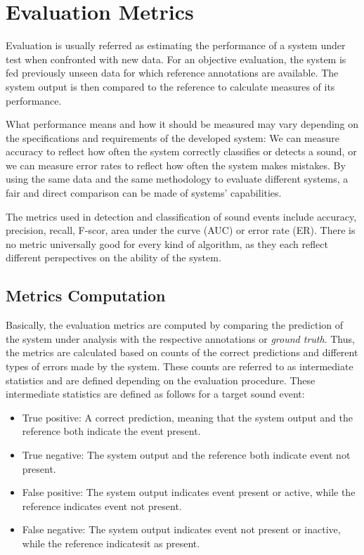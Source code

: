 \section{Evaluation Metrics}

Evaluation is usually referred as estimating the performance of a system under test
when confronted with new data. For an objective evaluation, the system is fed
previously unseen data for which reference annotations are available. The system output is then compared to the reference to calculate measures of its performance.

What performance means and how it should be measured may vary depending
on the specifications and requirements of the developed system: We can measure
accuracy to reflect how often the system correctly classifies or detects a sound, or we can measure error rates to reflect how often the system makes mistakes. By using
the same data and the same methodology to evaluate different systems, a fair and direct comparison can be made of systems’ capabilities.

The metrics used in detection and classification of sound events include accuracy, precision, recall, F-scor, area under the curve (AUC) or error rate (ER). There is no metric universally good for every kind of algorithm, as they each reflect different perspectives on the ability of the system.

\subsection{Metrics Computation}
Basically, the evaluation metrics are computed by comparing the prediction of the system under analysis with the respective annotations or \textit{ground truth}. Thus, the metrics are calculated based on counts of the correct predictions and different types of errors made by the system.
These counts are referred to as intermediate statistics and are defined depending on the evaluation procedure. These intermediate statistics are defined as follows for a target sound event:

\begin{itemize}
	\item True positive: A correct prediction, meaning that the system output and the reference both indicate the event present.
	\item True negative: The system output and the reference both indicate event not present.
	\item False positive: The system output indicates event  present or active, while the reference indicates event not present.
	\item False negative: The system output indicates event not present or inactive, while the reference indicatesit as present.
\end{itemize}

